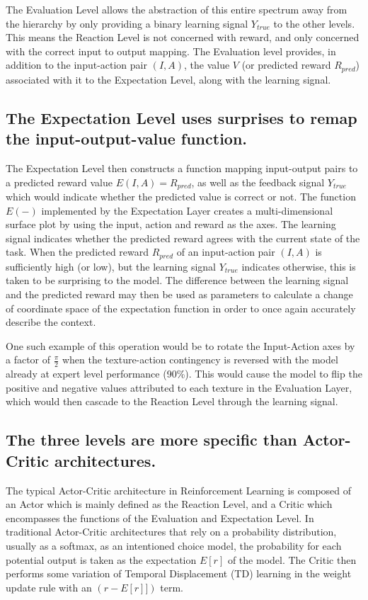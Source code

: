 \documentclass[11pt]{article}
\begin{document}
The Evaluation Level allows the abstraction of this entire spectrum away from the hierarchy by only providing a binary learning signal $Y_{true}$ to the other levels.  This means the Reaction Level is not concerned with reward, and only concerned with the correct input to output mapping.  The Evaluation level provides, in addition to the input-action pair $(I, A)$, the value $V$ (or predicted reward $R_{pred}$) associated with it to the Expectation Level, along with the learning signal.

\subsection{The Expectation Level uses surprises to remap the input-output-value function.}
The Expectation Level then constructs a function mapping input-output pairs to a predicted reward value $E(I, A) = R_{pred}$, as well as the feedback signal $Y_{true}$ which would indicate whether the predicted value is correct or not.  The function $E(-)$ implemented by the Expectation Layer creates a multi-dimensional surface plot by using the input, action and reward as the axes.  The learning signal indicates whether the predicted reward agrees with the current state of the task.  When the predicted reward $R_{pred}$ of an input-action pair $(I, A)$ is sufficiently high (or low), but the learning signal $Y_{true}$ indicates otherwise, this is taken to be surprising to the model.  The difference between the learning signal and the predicted reward may then be used as parameters to calculate a change of coordinate space of the expectation function in order to once again accurately describe the context.  

One such example of this operation would be to rotate the Input-Action axes by a factor of $\frac{\pi}{2}$ when the texture-action contingency is reversed with the model already at expert level performance (90\%).  This would cause the model to flip the positive and negative values attributed to each texture in the Evaluation Layer, which would then cascade to the Reaction Level through the learning signal.

\subsection{The three levels are more specific than Actor-Critic architectures.}

The typical Actor-Critic architecture in Reinforcement Learning is composed of an Actor which is mainly defined as the Reaction Level, and a Critic which encompasses the functions of the Evaluation and Expectation Level.  In traditional Actor-Critic architectures that rely on a probability distribution, usually as a softmax, as an intentioned choice model, the probability for each potential output is taken as the expectation $E[r]$ of the model.  The Critic then performs some variation of Temporal Displacement (TD) learning in the weight update rule with an $(r - E[r]])$ term.  
\end{document}
